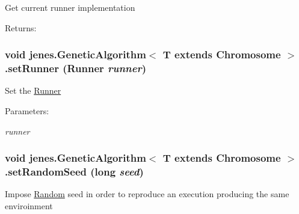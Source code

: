 Get current runner implementation \begin{Desc}
\item[Returns:]\end{Desc}
\hypertarget{classjenes_1_1_genetic_algorithm_3_01_t_01extends_01_chromosome_01_4_6ff8bcd8e9049106c7959637e4e10e70}{
\subsubsection[setRunner]{\setlength{\rightskip}{0pt plus 5cm}void jenes.GeneticAlgorithm$<$ T extends Chromosome $>$.setRunner ({\bf Runner} {\em runner})}}
\label{classjenes_1_1_genetic_algorithm_3_01_t_01extends_01_chromosome_01_4_6ff8bcd8e9049106c7959637e4e10e70}


Set the \hyperlink{}{Runner}

\begin{Desc}
\item[Parameters:]
\begin{description}
\item[{\em runner}]\end{description}
\end{Desc}
\hypertarget{classjenes_1_1_genetic_algorithm_3_01_t_01extends_01_chromosome_01_4_7e5f06abe9e8661cdb38bd0fa663da6c}{
\subsubsection[setRandomSeed]{\setlength{\rightskip}{0pt plus 5cm}void jenes.GeneticAlgorithm$<$ T extends Chromosome $>$.setRandomSeed (long {\em seed})}}
\label{classjenes_1_1_genetic_algorithm_3_01_t_01extends_01_chromosome_01_4_7e5f06abe9e8661cdb38bd0fa663da6c}


Impose \hyperlink{}{Random} seed in order to reproduce an execution producing the same enviroinment


